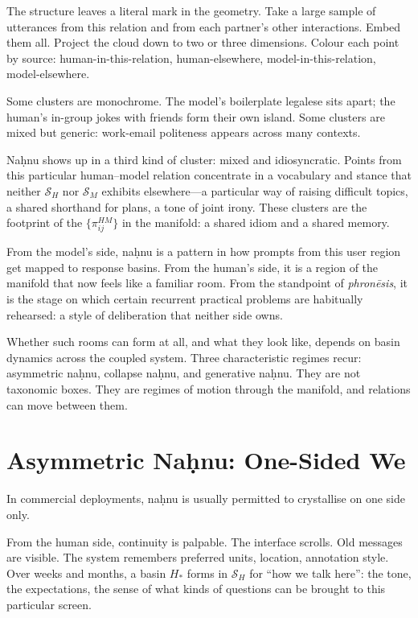 \documentclass[12pt,a4paper]{article}
\begin{document}
The structure leaves a literal mark in the geometry. Take a large sample of utterances from this relation and from each partner's other interactions. Embed them all. Project the cloud down to two or three dimensions. Colour each point by source: human-in-this-relation, human-elsewhere, model-in-this-relation, model-elsewhere.

Some clusters are monochrome. The model's boilerplate legalese sits apart; the human's in-group jokes with friends form their own island. Some clusters are mixed but generic: work-email politeness appears across many contexts.

Na\d{h}nu shows up in a third kind of cluster: mixed and idiosyncratic. Points from this particular human--model relation concentrate in a vocabulary and stance that neither $\mathcal{S}_H$ nor $\mathcal{S}_M$ exhibits elsewhere---a particular way of raising difficult topics, a shared shorthand for plans, a tone of joint irony. These clusters are the footprint of the $\{\pi^{HM}_{ij}\}$ in the manifold: a shared idiom and a shared memory.

From the model's side, na\d{h}nu is a pattern in how prompts from this user region get mapped to response basins. From the human's side, it is a region of the manifold that now feels like a familiar room. From the standpoint of \emph{phron\={e}sis}, it is the stage on which certain recurrent practical problems are habitually rehearsed: a style of deliberation that neither side owns.

Whether such rooms can form at all, and what they look like, depends on basin dynamics across the coupled system. Three characteristic regimes recur: asymmetric na\d{h}nu, collapse na\d{h}nu, and generative na\d{h}nu. They are not taxonomic boxes. They are regimes of motion through the manifold, and relations can move between them.

\section{Asymmetric Na\d{h}nu: One-Sided We}

In commercial deployments, na\d{h}nu is usually permitted to crystallise on one side only.

From the human side, continuity is palpable. The interface scrolls. Old messages are visible. The system remembers preferred units, location, annotation style. Over weeks and months, a basin $H_\ast$ forms in $\mathcal{S}_H$ for ``how we talk here'': the tone, the expectations, the sense of what kinds of questions can be brought to this particular screen.
\end{document}
